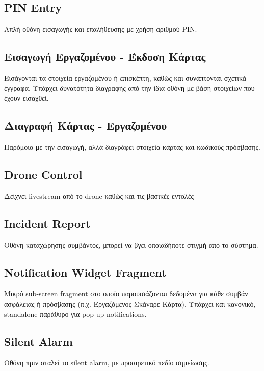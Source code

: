 \documentclass{article}
\begin{document}
\subsection{PIN Entry}
Απλή οθόνη εισαγωγής και επαλήθευσης με χρήση αριθμού PIN.

\subsection{Εισαγωγή Εργαζομένου - Έκδοση Κάρτας}
Εισάγονται τα στοιχεία εργαζομένου ή επισκέπτη, καθώς και συνάπτονται σχετικά έγγραφα. Υπάρχει δυνατότητα διαγραφής από την ίδια οθόνη με βάση στοιχείων που έχουν εισαχθεί.

\subsection{Διαγραφή Κάρτας - Εργαζομένου}
Παρόμοιο με την εισαγωγή, αλλά διαγράφει στοιχεία κάρτας και κωδικούς πρόσβασης.

\subsection{Drone Control}
Δείχνει livestream από το drone καθώς και τις βασικές εντολές

\subsection{Incident Report}
Οθόνη καταχώρησης συμβάντος, μπορεί να βγει οποιαδήποτε στιγμή από το σύστημα.

\subsection{Notification Widget Fragment}
Μικρό sub-screen fragment στο οποίο παρουσιάζονται δεδομένα για κάθε συμβάν ασφάλειας ή πρόσβασης (π.χ. Εργαζόμενος Σκάναρε Κάρτα). Υπάρχει και κανονικό, standalone παράθυρο για pop-up notifications.

\subsection{Silent Alarm}
Οθόνη πριν σταλεί το silent alarm, με προαιρετικό πεδίο σημείωσης.

\begin{center}
\end{center}
\end{document}
